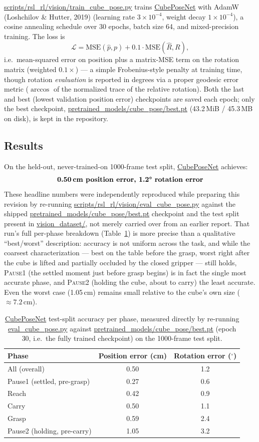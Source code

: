 \documentclass[11pt]{article}
\begin{document}
\url{scripts/rsl_rl/vision/train_cube_pose.py} trains \url{CubePoseNet} with
AdamW (Loshchilov \& Hutter, 2019) (learning rate $3\times10^{-4}$, weight decay $1\times10^{-4}$), a cosine
annealing schedule over 30 epochs, batch size 64, and mixed-precision training.
The loss is
\[
\mathcal{L} = \text{MSE}(\hat{p}, p) + 0.1 \cdot \text{MSE}(\hat{R}, R),
\]
i.e.\ mean-squared error on position plus a matrix-MSE term on the rotation matrix
(weighted $0.1\times$) --- a simple Frobenius-style penalty at training time,
though rotation \emph{evaluation} is reported in degrees via a proper geodesic
error metric ($\arccos$ of the normalized trace of the relative rotation). Both the last and best (lowest validation position error) checkpoints
are saved each epoch; only the best checkpoint,
\url{pretrained_models/cube_pose/best.pt} (43.2\,MiB / 45.3\,MB on disk), is kept in the
repository.

\subsection{Results}

On the held-out, never-trained-on 1000-frame test split, \url{CubePoseNet}
achieves:
\[
\textbf{0.50\,cm position error, 1.2\textdegree{} rotation error}
\]
These headline numbers were independently reproduced while preparing this
revision by re-running
\url{scripts/rsl_rl/vision/eval_cube_pose.py} against the shipped
\url{pretrained_models/cube_pose/best.pt} checkpoint and the test split present
in \url{vision_dataset/}, not merely carried over from an earlier report.
That run's full per-phase breakdown (Table~\ref{tab:vision_phase}) is more precise
than a qualitative ``best/worst'' description: accuracy is not uniform across the
task, and while the coarsest characterization --- best on the table before the grasp, worst
right after the cube is lifted and partially occluded by the closed gripper --- still holds, \textsc{Pause1} (the settled moment just before grasp begins) is
in fact the single most accurate phase, and \textsc{Pause2} (holding the cube,
about to carry) the least accurate. Even the worst case (1.05\,cm) remains small
relative to the cube's own size ($\approx 7.2$\,cm).

\begin{table}[h]
\centering
\caption{\url{CubePoseNet} test-split accuracy per phase, measured directly by
re-running \url{eval_cube_pose.py} against \url{pretrained_models/cube_pose/best.pt}
(epoch 30, i.e.\ the fully trained checkpoint) on the 1000-frame test split.}
\label{tab:vision_phase}
\begin{tabular}{lcc}
\toprule
Phase & Position error (cm) & Rotation error ($^\circ$) \\
\midrule
All (overall) & 0.50 & 1.2 \\
Pause1 (settled, pre-grasp) & 0.27 & 0.6 \\
Reach & 0.42 & 0.9 \\
Carry & 0.50 & 1.1 \\
Grasp & 0.59 & 2.4 \\
Pause2 (holding, pre-carry) & 1.05 & 3.2 \\
\bottomrule
\end{tabular}
\end{table}
\end{document}
